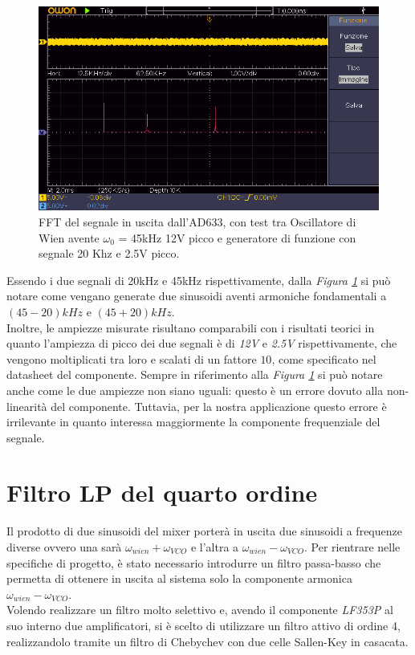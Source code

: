 \documentclass[titlepage]{report}
\begin{document}
	\begin{figure}[H]
		\centering
		\includegraphics[scale=0.9]{Immagini/uscita_ad633_con_fcngen_20k_e_osc_45k.png}
		\caption{FFT del segnale in uscita dall'AD633, con test tra Oscillatore di Wien avente $\omega_0$ = 45kHz 12V picco e generatore di funzione con segnale 20 Khz e 2.5V picco.}
		\label{fig:FFTmixer}
	\end{figure}
	
	 \noindent Essendo i due segnali di 20kHz e 45kHz rispettivamente, dalla \textit{Figura \ref{fig:FFTmixer}} si può notare come vengano generate due sinusoidi aventi armoniche fondamentali a $(45-20)kHz$ e $(45+20)kHz$. 
	 \\
	 Inoltre, le ampiezze misurate risultano comparabili con i risultati teorici in quanto l'ampiezza di picco dei due segnali è di \textit{12V} e \textit{2.5V} rispettivamente, che vengono moltiplicati tra loro e scalati di un fattore $10$, come specificato nel datasheet del componente. Sempre in riferimento alla \textit{Figura \ref{fig:FFTmixer}} si può notare anche come le due ampiezze non siano uguali: questo è un errore dovuto alla non-linearità del componente. Tuttavia, per la nostra applicazione questo errore è irrilevante in quanto interessa maggiormente la componente frequenziale del segnale.
	

\section{Filtro LP del quarto ordine}
	\label{sec:LP4}
	Il prodotto di due sinusoidi del mixer porterà in uscita due sinusoidi a frequenze diverse ovvero una sarà $\omega_{wien} + \omega_{VCO}$ e l'altra a $\omega_{wien} - \omega_{VCO}$. Per rientrare nelle specifiche di progetto, è stato necessario introdurre un filtro passa-basso che permetta di ottenere in uscita al sistema solo la componente armonica $\omega_{wien} - \omega_{VCO}$.
	\\ 
	Volendo realizzare un filtro molto selettivo e, avendo il componente \textit{LF353P} al suo interno due amplificatori, si è scelto di utilizzare un filtro attivo di ordine 4, realizzandolo tramite un filtro di Chebychev con due celle Sallen-Key in casacata. 
	
\end{document}
